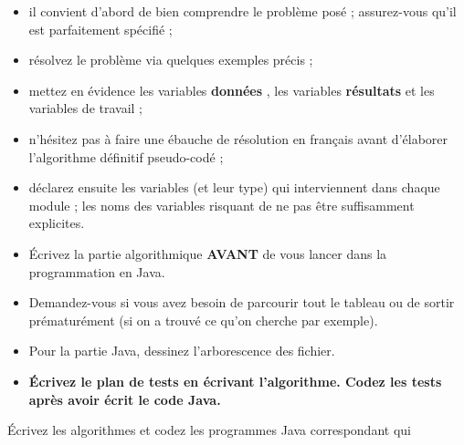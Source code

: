 \documentclass[11pt,a4paper]{article}
\begin{document}
					\begin{itemize}
				
			\item il convient d'abord de bien comprendre le probl\`eme pos\'e ; assurez-vous qu'il est parfaitement sp\'ecifi\'e ;
			\item r\'esolvez le probl\`eme via quelques exemples pr\'ecis ;
			\item mettez en \'evidence les variables \textbf{\guillemotleft  donn\'ees \guillemotright }, les variables \textbf{\guillemotleft  r\'esultats \guillemotright } et les variables de travail ;
			\item n'h\'esitez pas \`a faire une \'ebauche de r\'esolution en fran\c cais avant d'\'elaborer l'algorithme d\'efinitif pseudo-cod\'e ;
			\item d\'eclarez ensuite les variables (et leur type) qui interviennent dans chaque module ; les noms des variables risquant de ne pas \^etre suffisamment explicites.
			\item \'Ecrivez la partie algorithmique \textbf{AVANT} de vous lancer dans la programmation en Java.
			\item Demandez-vous si vous avez besoin de parcourir tout le tableau ou de sortir pr\'ematur\'ement (si on a trouv\'e ce qu'on cherche par exemple).
			\item Pour la partie Java, dessinez l'arborescence des fichier. 
			\item \textbf{\'Ecrivez le plan de tests en \'ecrivant l'algorithme. Codez les tests apr\`es avoir \'ecrit le code Java.}
					\end{itemize}
				
            \par
        
        \'Ecrivez les algorithmes et codez les programmes Java correspondant qui 
          
\end{document}
